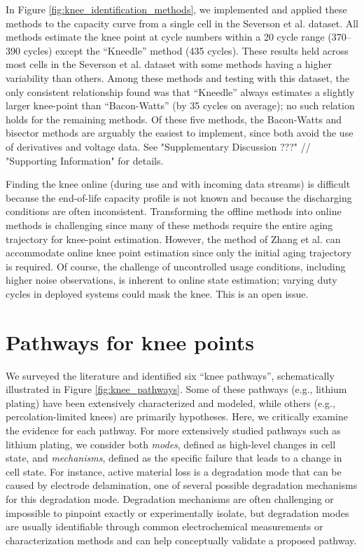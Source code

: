 \documentclass[journal=jpclcd,manuscript=article]{achemso}
\begin{document}
In Figure \ref{fig:knee_identification_methods}, we implemented and applied these methods to the capacity curve from a single cell in the Severson et al.\cite{severson_data-driven_2019} dataset. All methods estimate the knee point at cycle numbers within a 20 cycle range (370--390 cycles) except the ``Kneedle'' method (435 cycles). 
These results held across most cells in the Severson et al.\cite{severson_data-driven_2019} dataset with some methods having a  higher variability than others.   
Among these methods and testing with this dataset, the only consistent relationship found was that  ``Kneedle'' always estimates a slightly larger knee-point than ``Bacon-Watts'' (by 35 cycles on average); no such relation holds for the remaining methods. 
Of these five methods, the Bacon-Watts and bisector methods are arguably the easiest to implement, since both avoid the use of derivatives and voltage data. See "Supplementary Discussion ???" // "Supporting Information" for details. 

Finding the knee online (during use and with incoming data streams) is difficult because the end-of-life capacity profile is not known and because the discharging conditions are often inconsistent. Transforming the offline methods into online methods is challenging since many of these methods require the entire aging trajectory for knee-point estimation. However, the method of Zhang et al.\cite{zhang_accelerated_2019} can accommodate online knee point estimation since only the initial aging trajectory is required. Of course, the challenge of uncontrolled usage conditions, including higher noise observations, is inherent to online state estimation; varying duty cycles in deployed systems could mask the knee. This is an open issue.



\section{Pathways for knee points}

We surveyed the literature and identified six ``knee pathways'', schematically illustrated in Figure \ref{fig:knee_pathways}. Some of these pathways (e.g., lithium plating) have been extensively characterized and modeled, while others (e.g., percolation-limited knees) are primarily hypotheses. Here, we critically examine the evidence for each pathway. For more extensively studied pathways such as lithium plating, we consider both \textit{modes}, defined as high-level changes in cell state, and \textit{mechanisms}, defined as the specific failure that leads to a change in cell state. For instance, active material loss is a degradation mode that can be caused by electrode delamination, one of several possible degradation mechanisms for this degradation mode. Degradation mechanisms are often challenging or impossible to pinpoint exactly or experimentally isolate, but degradation modes are usually identifiable through common electrochemical measurements or characterization methods and can help conceptually validate a proposed pathway.
\end{document}
